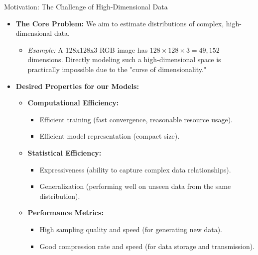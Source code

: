\begin{frame}[allowframebreaks]{Motivation: The Challenge of High-Dimensional Data}
    \begin{itemize}
        \item \textbf{The Core Problem:} We aim to estimate distributions of complex, high-dimensional data.
        \begin{itemize}
            \item \textit{Example:} A 128x128x3 RGB image has $128 \times 128 \times 3 = 49,152$ dimensions. Directly modeling such a high-dimensional space is practically impossible due to the "curse of dimensionality."
        \end{itemize}
        \item \textbf{Desired Properties for our Models:}
        \begin{itemize}
            \item \textbf{Computational Efficiency:}
            \begin{itemize}
                \setlength{\itemsep}{-0.6em}
                \item Efficient training (fast convergence, reasonable resource usage).
                \item Efficient model representation (compact size).
            \end{itemize}
            \item \textbf{Statistical Efficiency:}
            \begin{itemize}
                \setlength{\itemsep}{-0.6em}
                \item Expressiveness (ability to capture complex data relationships).
                \item Generalization (performing well on unseen data from the same distribution).
            \end{itemize}
            \item \textbf{Performance Metrics:}
            \begin{itemize}
                \setlength{\itemsep}{-0.6em}
                \item High sampling quality and speed (for generating new data).
                \item Good compression rate and speed (for data storage and transmission).
            \end{itemize}
        \end{itemize}
    \end{itemize}
\end{frame}

